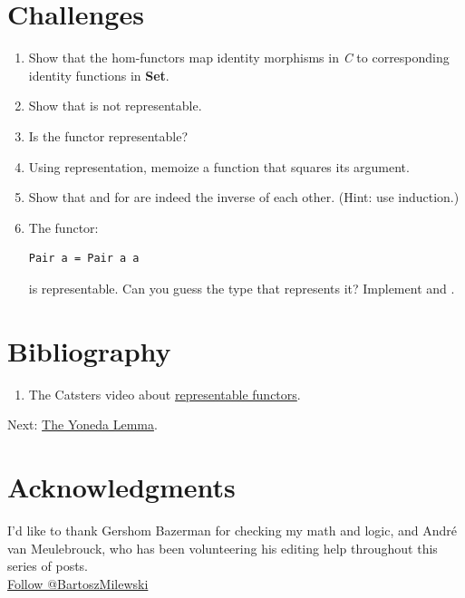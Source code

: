 \section{Challenges}\label{challenges}

\begin{enumerate}
\item
  Show that the hom-functors map identity morphisms in \emph{C} to
  corresponding identity functions in \textbf{Set}.
\item
  Show that  is not representable.
\item
  Is the  functor representable?
\item
  Using  representation, memoize a function that squares
  its argument.
\item
  Show that  and  for  are
  indeed the inverse of each other. (Hint: use induction.)
\item
  The functor:

\begin{verbatim}
Pair a = Pair a a
\end{verbatim}

  is representable. Can you guess the type that represents it? Implement
   and .
\end{enumerate}

\section{Bibliography}\label{bibliography}

\begin{enumerate}
\tightlist
\item
  The Catsters video about
  \href{https://www.youtube.com/watch?v=4QgjKUzyrhM}{representable
  functors}.
\end{enumerate}

Next:
\href{https://bartoszmilewski.com/2015/09/01/the-yoneda-lemma/}{The
Yoneda Lemma}.

\section{Acknowledgments}\label{acknowledgments}

I'd like to thank Gershom Bazerman for checking my math and logic, and
André van Meulebrouck, who has been volunteering his editing help
throughout this series of posts.\\
\href{https://twitter.com/BartoszMilewski}{Follow @BartoszMilewski}
